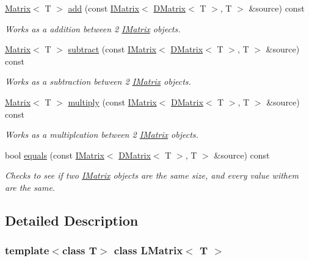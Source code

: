 \begin{DoxyCompactItemize}
\mbox{\hyperlink{class_matrix}{Matrix}}$<$ T $>$ \mbox{\hyperlink{class_l_matrix_a134ae507dfaf35679e0008ad5b6f92f1}{add}} (const \mbox{\hyperlink{class_i_matrix}{I\+Matrix}}$<$ \mbox{\hyperlink{class_d_matrix}{D\+Matrix}}$<$ T $>$, T $>$ \&source) const
\begin{DoxyCompactList}\small\item\em Works as a addition between 2 \mbox{\hyperlink{class_i_matrix}{I\+Matrix}} objects. \end{DoxyCompactList}\item 
\mbox{\hyperlink{class_matrix}{Matrix}}$<$ T $>$ \mbox{\hyperlink{class_l_matrix_a4e030fc2936788b67a587e2eee786076}{subtract}} (const \mbox{\hyperlink{class_i_matrix}{I\+Matrix}}$<$ \mbox{\hyperlink{class_d_matrix}{D\+Matrix}}$<$ T $>$, T $>$ \&source) const
\begin{DoxyCompactList}\small\item\em Works as a subtraction between 2 \mbox{\hyperlink{class_i_matrix}{I\+Matrix}} objects. \end{DoxyCompactList}\item 
\mbox{\hyperlink{class_matrix}{Matrix}}$<$ T $>$ \mbox{\hyperlink{class_l_matrix_a68ca1f28d4ca8ace38b621fb89e57631}{multiply}} (const \mbox{\hyperlink{class_i_matrix}{I\+Matrix}}$<$ \mbox{\hyperlink{class_d_matrix}{D\+Matrix}}$<$ T $>$, T $>$ \&source) const
\begin{DoxyCompactList}\small\item\em Works as a multiplcation between 2 \mbox{\hyperlink{class_i_matrix}{I\+Matrix}} objects. \end{DoxyCompactList}\item 
bool \mbox{\hyperlink{class_l_matrix_a11fde8a497e4c0c733f6602230ec7ccb}{equals}} (const \mbox{\hyperlink{class_i_matrix}{I\+Matrix}}$<$ \mbox{\hyperlink{class_d_matrix}{D\+Matrix}}$<$ T $>$, T $>$ \&source) const
\begin{DoxyCompactList}\small\item\em Checks to see if two \mbox{\hyperlink{class_i_matrix}{I\+Matrix}} objects are the same size, and every value withem are the same. \end{DoxyCompactList}\end{DoxyCompactItemize}


\subsection{Detailed Description}
\subsubsection*{template$<$class T$>$\newline
class L\+Matrix$<$ T $>$}

